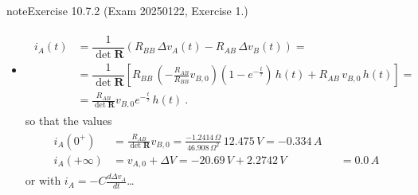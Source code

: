 \documentclass[letterpaper,10pt,italian]{jupyterBook}
\begin{document}
\begin{sphinxadmonition}{note}{Exercise 10.7.2 (Exam 2025\sphinxhyphen{}01\sphinxhyphen{}22, Exercise 1.)}
\begin{itemize}
\sphinxAtStartPar
with \(\Delta v_{A,+\infty} = -\frac{R_{AB}}{R_{BB}} v_{B,0} = 2.2742 \, V\). The voltage across the capacitor as a function of time \(t\) thus reads
\begin{equation*}
\begin{split}\begin{aligned}
     v_A(t) 
     & = v_{A,0} + \Delta v_A(t) = \\
     & = v_{A,0} + \Delta v_{A,+\infty} \left( 1 - e^{-\frac{t}{\tau}} \right) \, h(t) \ ,
   \end{aligned}\end{split}
\end{equation*}
\sphinxAtStartPar
so that the values
\begin{equation*}
\begin{split}\begin{aligned} 
     v_A(0^+) & = v_{A,0}  && = -20.69 \, V \\
     v_A(+\infty) & = v_{A,0} + \Delta V = -20.69 \, V + 2.2742 \, V && = -18.4158 \, V
   \end{aligned}\end{split}
\end{equation*}
\item {} 
\sphinxAtStartPar
{}
\begin{equation*}
\begin{split}\begin{aligned}
      i_A(t)
      & = \dfrac{1}{\det \mathbf{R}} \left( R_{BB} \, \Delta v_A(t) - R_{AB} \, \Delta v_B(t) \right) = \\
      & = \dfrac{1}{\det \mathbf{R}} \left[ R_{BB} \, \left( -\frac{R_{AB}}{R_{BB}} v_{B,0} \right) \left( 1 - e^{-\frac{t}{\tau}} \right) \, h(t)  + R_{AB} \, v_{B,0} \, h(t) \right] = \\
      & = \frac{R_{AB}}{\det \mathbf{R}} v_{B,0} e^{-\frac{t}{\tau}} \, h(t) \ .
   \end{aligned}\end{split}
\end{equation*}
\sphinxAtStartPar
so that the values
\begin{equation*}
\begin{split}\begin{aligned} 
     i_A(0^+) & = \frac{R_{AB}}{\det \mathbf{R}} v_{B,0} = \frac{-1.2414 \, \Omega}{46.908 \, \Omega^2} \, 12.475 \, V = -0.334 \, A \\
     i_A(+\infty) & = v_{A,0} + \Delta V = -20.69 \, V + 2.2742 \, V && = 0.0 \, A
   \end{aligned}\end{split}
\end{equation*}
\sphinxAtStartPar
or with \(i_A = - C \frac{d \Delta v_A}{dt}\)…


\end{itemize}
\end{sphinxadmonition}
\end{document}
